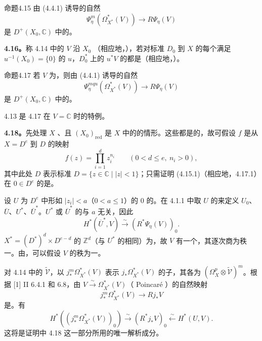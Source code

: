 \begin{SGAresult}{命题}{4.15}
由 (4.4.1) 诱导的自然
\[
 \Psi_\eta^m(\Omega_{X^*}^*(V))\longrightarrow R\Psi_\eta(V)\tag{4.15.1}
\]
是 $D^+(X_0,\mathbb C)$ 中的。
\end{SGAresult}

\textbf{4.16。}称 4.14 中的 $V$ 沿 $X_0$ （相应地，），若对标准 $D_0$ 到 $X$ 的每个满足 $u^{-1}(X_0)=\{0\}$ 的 $u$，$D_0^*$ 上的 $u^*V$ 的都是（相应地，）。

\begin{SGAresult}{命题}{4.17}
若 $V$ 为，则由 (4.4.1) 诱导的自然
\[
 \Psi_\eta^{mqu}(\Omega_{X^*}^*(V))\longrightarrow R\Psi_\eta(V)\tag{4.17.1}
\]
是 $D^+(X_0,\mathbb C)$ 中的。
\end{SGAresult}

 4.13 是 4.17 在 $V=\mathbb C$ 时的特例。

\textbf{4.18。}先处理 $X$ 、且 $(X_0)_{\mathrm{red}}$ 是 $X$ 中的的情形。这些都是的，故可假设 $f$ 是从 $X=D^e$ 到 $D$ 的映射
\[
 f(z)=\prod_{i=1}^dz_i^{n_i}\qquad(0<d\leq e,\ n_i>0),
\]
其中此处 $D$ 表示标准 $D=\{z\in\mathbb C\mid|z|<1\}$；只需证明 (4.15.1)（相应地，4.17.1）在 $0\in D^e$ 的是。

设 $U$ 为 $D^e$ 中形如 $|z_i|<a$（$0<a\leq1$）的 $0$ 的。在 4.1.1 中取 $U$ 的来定义 $U_0$、$\overline U$、$U^*$、$\overline U^*$。$U^*$ 或 $\overline U^*$ 的与 $a$ 无关，因此
\[
 H^*(\overline U^*,V)\xrightarrow{\sim}(R^*\Psi_\eta(V))_0.
\]
$X^*=(D^*)^d\times D^{e-d}$ 的 $\mathbb Z^d$（与 $U^*$ 的相同）为，故 $V$ 有一个，其逐次商为秩一。由，可以假设 $V$ 的秩为一。

对 4.14 中的 $\widetilde{\mathscr V}$，以 $j_*^m\Omega_{X^*}^*(V)$ 表示 $j_*\Omega_{X^*}^*(V)$ 的子，其各为 $(\Omega_X^p\otimes\widetilde{\mathscr V})^m$。根据 [1] II 6.4.1 和 6.8，由 $V\xrightarrow{\sim}\Omega_{X^*}^*(V)$（ Poincaré ）的自然映射
\[
 j_*^m\Omega_{X^*}^*(V)\longrightarrow Rj_*V\tag{4.18.1}
\]
是。有
\[
 H^*((j_*^m\Omega_{X^*}^*(V))_0)\xrightarrow{\sim}(R^*j_*V)_0
 \xleftarrow{\sim}H^*(U,V).\tag{4.18.2}
\]
这将是证明中 4.18 这一部分所用的唯一解析成分。

